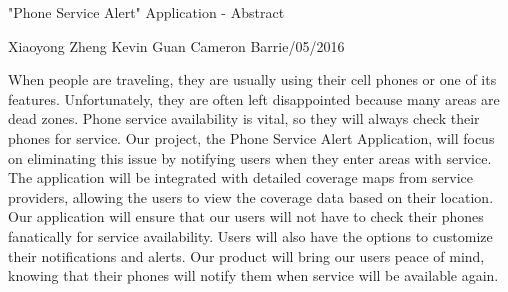 \documentclass[letterpaper,10pt]{article}
\begin{document}
\begin{center}
\Large{"Phone Service Alert" Application - Abstract}
\end{center}
\begin{flushright}
Xiaoyong Zheng\linebreak
Kevin Guan\linebreak
Cameron Barrie/05/2016
\end{flushright}
\begin{flushleft}
\indent
When people are traveling, they are usually using their cell phones or one of its features. Unfortunately, they are often left disappointed because many areas are dead zones.  Phone service availability is vital, so they will always check their phones for service. Our project, the Phone Service Alert Application, will focus on eliminating this issue by notifying users when they enter areas with service. The application will be integrated with detailed coverage maps from service providers, allowing the users to view the coverage data based on their location. Our application will ensure that our users will not have to check their phones fanatically for service availability. Users will also have the options to customize their notifications and alerts. Our product will bring our users peace of mind, knowing that their phones will notify them when service will be available again. 
\end{flushleft}
\end{document}
